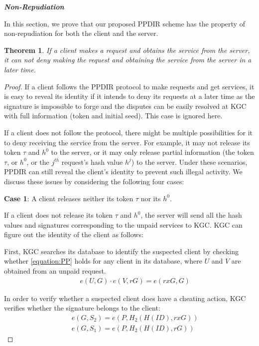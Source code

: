 \documentclass[letterpaper,12pt]{article}
\newtheorem{theorem}{Theorem}
\begin{document}
\textbf{\emph{Non-Repudiation}}

In this section, we prove that our proposed PPDIR scheme has the property of non-repudiation for both the client and the server.

\begin{theorem}\label{sec:sec:analysis:client_theorem}
If a client makes a request and obtains the service from the server, it can not  deny making the request and obtaining the service from the server in a later time.
\end{theorem}


\begin{proof} If a client follows the PPDIR protocol to make requests and get services,  it is easy to reveal its identity if it intends to deny its requests at a later time as the signature is impossible to forge and the disputes can be easily resolved at KGC with full information (token and initial seed). This case is ignored here.

If a client does not follow the protocol, there might be multiple possibilities for it to deny receiving the service from the server. For example, it may not release its token $\tau$ and $h^0$ to the server, or it may only release partial information (the token $\tau$, or $h^0$, or the $j^{th}$ request's hash value $h^j$) to the server. Under these scenarios, PPDIR can still reveal the client's identity to prevent such illegal activity. We discuss these issues by considering the following four cases:

\textbf{Case 1}: A client releases neither its token $\tau$ nor its $h^0$.

If a client does not release its token $\tau$ and $h^0$, the server will send all the hash values and signatures corresponding to the unpaid services to KGC. KGC can figure out the identity of the client as follows:

First, KGC searches its database to identify the suspected client by checking whether  \eqref{equation:PP} holds for any client in its database, where $U$ and $V$ are obtained from an unpaid request.
\begin{eqnarray} \label{eq:case1:KGC}
&&e(U, G)\cdot e(V, rG)=e(rxG, G) \label{equation:PP}
\end{eqnarray}

In order to verify whether a suspected client does have a cheating action, KGC verifies whether the signature belongs to the client:
\begin{eqnarray}
&&e(G, S_2)=e(P, H_2(H(ID), rxG)) \label{equation:SP}\\
&&e(G, S_1)=e(P, H_2(H(ID), rG))\label{equation:SIDP}
\end{eqnarray}


\end{proof}
\end{document}
